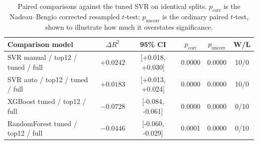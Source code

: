 \begin{table}[htbp]
\centering
\caption{Paired comparisons against the tuned SVR on identical splits. $p_{\text{corr}}$ is the Nadeau--Bengio corrected resampled $t$-test; $p_{\text{uncorr}}$ is the ordinary paired $t$-test, shown to illustrate how much it overstates significance.}\label{tab:paired}
\small
\begin{tabular}{lccccc}
\toprule
Comparison model & $\Delta R^2$ & 95\% CI & $p_{\text{corr}}$ & $p_{\text{uncorr}}$ & W/L \\
\midrule
SVR manual / top12 / tuned / full & $+0.0242$ & [+0.018, +0.030] & 0.0000 & 0.0000 & 10/0 \\
SVR auto / top12 / tuned / full & $+0.0183$ & [+0.013, +0.024] & 0.0000 & 0.0000 & 10/0 \\
XGBoost tuned / top12 / full & $-0.0728$ & [-0.084, -0.061] & 0.0000 & 0.0000 & 0/10 \\
RandomForest tuned / top12 / full & $-0.0446$ & [-0.060, -0.029] & 0.0001 & 0.0000 & 0/10 \\
\bottomrule
\end{tabular}
\end{table}